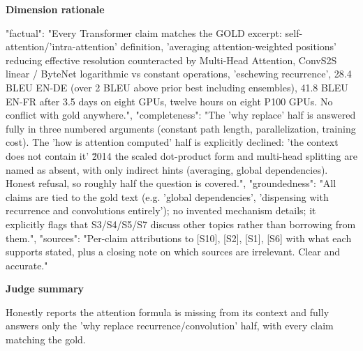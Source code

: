 \documentclass[10pt]{article}
\begin{document}
\textbf{Dimension rationale}
\begin{EvidenceText}
{
  "factual": "Every Transformer claim matches the GOLD excerpt: self-attention/'intra-attention' definition, 'averaging attention-weighted positions' reducing effective resolution counteracted by Multi-Head Attention, ConvS2S linear / ByteNet logarithmic vs constant operations, 'eschewing recurrence', 28.4 BLEU EN-DE (over 2 BLEU above prior best including ensembles), 41.8 BLEU EN-FR after 3.5 days on eight GPUs, twelve hours on eight P100 GPUs. No conflict with gold anywhere.",
  "completeness": "The 'why replace' half is answered fully in three numbered arguments (constant path length, parallelization, training cost). The 'how is attention computed' half is explicitly declined: 'the context does not contain it' \u2014 the scaled dot-product form and multi-head splitting are named as absent, with only indirect hints (averaging, global dependencies). Honest refusal, so roughly half the question is covered.",
  "groundedness": "All claims are tied to the gold text (e.g. 'global dependencies', 'dispensing with recurrence and convolutions entirely'); no invented mechanism details; it explicitly flags that S3/S4/S5/S7 discuss other topics rather than borrowing from them.",
  "sources": "Per-claim attributions to [S10], [S2], [S1], [S6] with what each supports stated, plus a closing note on which sources are irrelevant. Clear and accurate."
}
\end{EvidenceText}

\textbf{Judge summary}
\begin{EvidenceText}
Honestly reports the attention formula is missing from its context and fully answers only the 'why replace recurrence/convolution' half, with every claim matching the gold.
\end{EvidenceText}
\end{document}
